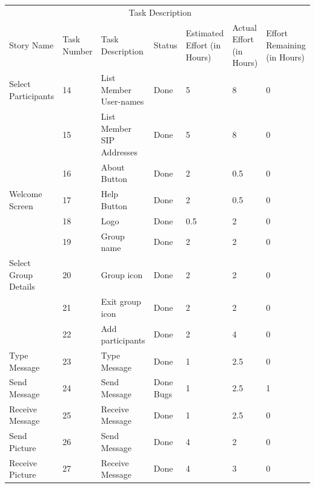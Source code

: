 \documentclass[a4paper]{article}
\begin{document}
\vfill

\begin{table}[H] 
\begin{tabular}{p{3cm} p{1cm} p{3.5cm} p{1cm} p{1cm} p{1cm} p{1cm}} 
\hline %
& \multicolumn{5}{c}{Task Description} \\
\cmidrule(l){2-7}
Story Name & Task Number & Task Description & Status & Estimated Effort (in Hours) & Actual Effort (in Hours) & Effort Remaining (in Hours)\\ %
\hline

Select Participants & 14 & List Member User-names & Done & 5 & 8 & 0\\ \cmidrule(l){2-6}

 & 15 & List Member SIP Addresses & Done & 5 & 8 & 0\\ 
\midrule

& 16 & About Button & Done & 2 & 0.5 & 0\\ \cmidrule(l){2-6}

Welcome Screen & 17 & Help Button & Done & 2 & 0.5 & 0\\ \cmidrule(l){2-6}

& 18 & Logo & Done & 0.5 & 2 & 0\\ 
\midrule

 & 19 & Group name & Done & 2 & 2 & 0\\\cmidrule(l){2-6}

Select Group Details &  20  & Group icon & Done & 2 & 2 & 0\\\cmidrule(l){2-6}

 & 21 & Exit group icon & Done & 2 & 2 & 0\\\cmidrule(l){2-6}

 & 22 & Add participants & Done & 2 & 4 & 0\\ 
 \midrule

Type Message & 23 & Type Message & Done & 1 & 2.5 & 0\\ 
 \midrule
 
 Send Message & 24 & Send Message & Done Bugs & 1 & 2.5 & 1\\ 
 \midrule
 
 Receive Message & 25 & Receive Message & Done & 1 & 2.5 & 0\\ 
 \midrule
 
 Send Picture & 26 & Send Message & Done & 4 & 2 & 0\\ 
 \midrule
 
 Receive Picture & 27 & Receive Message & Done & 4 & 3 & 0\\ 
 \midrule
 

\end{tabular}
\end{table}
\end{document}
